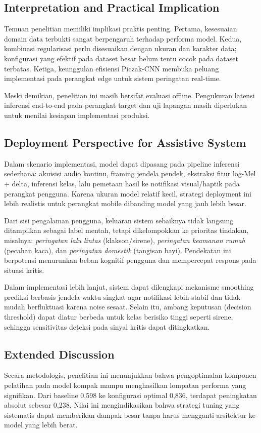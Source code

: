 \documentclass[10pt,a4paper]{jurnalvarian}
\let\LaTeXsubsection\subsection
\def\subsection{\setlength{\leftskip}{0.6cm}\LaTeXsubsection}
\begin{document}
\subsection{Interpretation and Practical Implication}
Temuan penelitian memiliki implikasi praktis penting. Pertama, kesesuaian domain data terbukti sangat berpengaruh terhadap performa model. Kedua, kombinasi regularisasi perlu disesuaikan dengan ukuran dan karakter data; konfigurasi yang efektif pada dataset besar belum tentu cocok pada dataset terbatas. Ketiga, keunggulan efisiensi Piczak-CNN membuka peluang implementasi pada perangkat edge untuk sistem peringatan real-time.

Meski demikian, penelitian ini masih bersifat evaluasi offline. Pengukuran latensi inferensi end-to-end pada perangkat target dan uji lapangan masih diperlukan untuk menilai kesiapan implementasi produksi.

\subsection{Deployment Perspective for Assistive System}
Dalam skenario implementasi, model dapat dipasang pada pipeline inferensi sederhana: akuisisi audio kontinu, framing jendela pendek, ekstraksi fitur log-Mel + delta, inferensi kelas, lalu pemetaan hasil ke notifikasi visual/haptik pada perangkat pengguna. Karena ukuran model relatif kecil, strategi deployment ini lebih realistis untuk perangkat mobile dibanding model yang jauh lebih besar.

Dari sisi pengalaman pengguna, keluaran sistem sebaiknya tidak langsung ditampilkan sebagai label mentah, tetapi dikelompokkan ke prioritas tindakan, misalnya: \textit{peringatan lalu lintas} (klakson/sirene), \textit{peringatan keamanan rumah} (pecahan kaca), dan \textit{peringatan domestik} (tangisan bayi). Pendekatan ini berpotensi menurunkan beban kognitif pengguna dan mempercepat respons pada situasi kritis.

Dalam implementasi lebih lanjut, sistem dapat dilengkapi mekanisme smoothing prediksi berbasis jendela waktu singkat agar notifikasi lebih stabil dan tidak mudah berfluktuasi karena noise sesaat. Selain itu, ambang keputusan (decision threshold) dapat diatur berbeda untuk kelas berisiko tinggi seperti sirene, sehingga sensitivitas deteksi pada sinyal kritis dapat ditingkatkan.

\subsection{Extended Discussion}
Secara metodologis, penelitian ini menunjukkan bahwa pengoptimalan komponen pelatihan pada model kompak mampu menghasilkan lompatan performa yang signifikan. Dari baseline 0,598 ke konfigurasi optimal 0,836, terdapat peningkatan absolut sebesar 0,238. Nilai ini mengindikasikan bahwa strategi tuning yang sistematis dapat memberikan dampak besar tanpa harus mengganti arsitektur ke model yang lebih berat.
\end{document}
